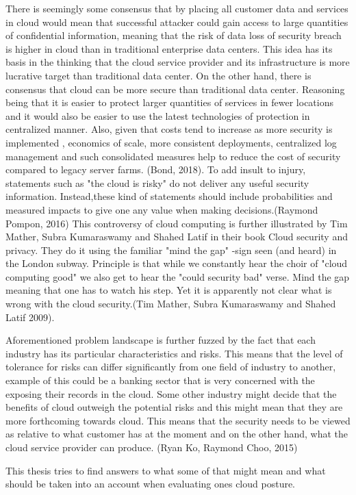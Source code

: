 \documentclass{article}
\begin{document}
There is seemingly some consensus that by placing all customer data and services in cloud would mean that successful attacker could gain access to large quantities of confidential information, meaning that the risk of data loss of security breach is higher in cloud than in traditional enterprise data centers. This idea has its basis in the thinking that the cloud service provider and its infrastructure is more lucrative target than traditional data center. On the other hand, there is consensus that cloud can be more secure than traditional data center. Reasoning being that it is easier to protect larger quantities of services in fewer locations and it would also be easier to use the latest technologies of protection in centralized manner. Also, given that costs tend to increase as more security is implemented , economics of scale, more consistent deployments, centralized log management and such consolidated measures help to reduce the cost of security compared to legacy server farms. (Bond, 2018). To add insult to injury, statements such as "the cloud is risky" do not deliver any useful security information. Instead,these kind of statements should include probabilities and measured impacts to give one any value when making decisions.(Raymond Pompon, 2016) 
This controversy of cloud computing is further illustrated by Tim Mather, Subra Kumaraswamy and Shahed Latif in their book Cloud security and privacy. They do it using the familiar "mind the gap" -sign seen (and heard) in the London subway. Principle is that while we constantly hear the choir of "cloud computing good" we also get to hear the "could security bad" verse. Mind the gap meaning that one has to watch his step. Yet it is apparently not clear what is wrong with the cloud security.(Tim Mather, Subra Kumaraswamy and Shahed Latif 2009).
\par
Aforementioned problem landscape is further fuzzed by the fact that each industry has its particular characteristics and risks. This means that the level of tolerance for risks can differ significantly from one field of industry to another, example of this could be a banking sector that is very concerned with the exposing their records in the cloud. Some other industry might decide that the benefits of cloud outweigh the potential risks and this might mean that they are more forthcoming towards cloud. This means that the security needs to be viewed as relative to what customer has at the moment and on the other hand, what the cloud service provider can produce. (Ryan Ko, Raymond Choo, 2015)
\par
This thesis tries to find answers to what some of that might mean and what should be taken into an account when evaluating ones cloud posture.
\end{document}
